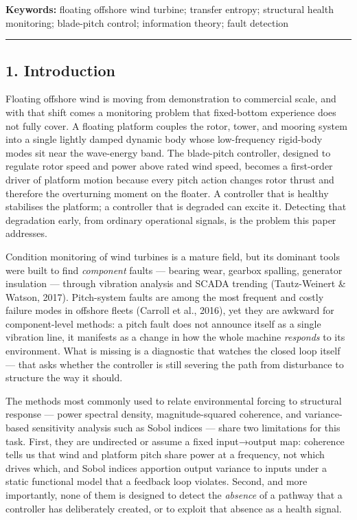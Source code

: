 \documentclass[
  english,
  11pt,
]{article}
\begin{document}
\textbf{Keywords:} floating offshore wind turbine; transfer entropy;
structural health monitoring; blade-pitch control; information theory;
fault detection

\begin{center}\rule{0.5\linewidth}{0.5pt}\end{center}

\subsection{1. Introduction}\label{introduction}

Floating offshore wind is moving from demonstration to commercial scale,
and with that shift comes a monitoring problem that fixed-bottom
experience does not fully cover. A floating platform couples the rotor,
tower, and mooring system into a single lightly damped dynamic body
whose low-frequency rigid-body modes sit near the wave-energy band. The
blade-pitch controller, designed to regulate rotor speed and power above
rated wind speed, becomes a first-order driver of platform motion
because every pitch action changes rotor thrust and therefore the
overturning moment on the floater. A controller that is healthy
stabilises the platform; a controller that is degraded can excite it.
Detecting that degradation early, from ordinary operational signals, is
the problem this paper addresses.

Condition monitoring of wind turbines is a mature field, but its
dominant tools were built to find \emph{component} faults --- bearing
wear, gearbox spalling, generator insulation --- through vibration
analysis and SCADA trending (Tautz-Weinert \& Watson, 2017).
Pitch-system faults are among the most frequent and costly failure modes
in offshore fleets (Carroll et al., 2016), yet they are awkward for
component-level methods: a pitch fault does not announce itself as a
single vibration line, it manifests as a change in how the whole machine
\emph{responds} to its environment. What is missing is a diagnostic that
watches the closed loop itself --- that asks whether the controller is
still severing the path from disturbance to structure the way it should.

The methods most commonly used to relate environmental forcing to
structural response --- power spectral density, magnitude-squared
coherence, and variance-based sensitivity analysis such as Sobol indices
--- share two limitations for this task. First, they are undirected or
assume a fixed input→output map: coherence tells us that wind and
platform pitch share power at a frequency, not which drives which, and
Sobol indices apportion output variance to inputs under a static
functional model that a feedback loop violates. Second, and more
importantly, none of them is designed to detect the \emph{absence} of a
pathway that a controller has deliberately created, or to exploit that
absence as a health signal.
\end{document}
